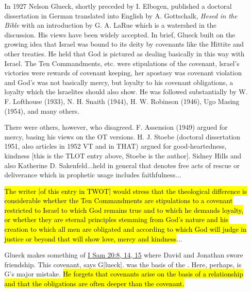 \begin{compactdesc}
\begin{compactdesc}
								In 1927 Nelson Glueck, shortly preceded by I. Elbogen, published a doctoral dissertation in German translated into English by A. Gottschalk, \textit{Hesed in the Bible} with an introduction by G. A. LaRue which is a watershed in the discussion. His views have been widely accepted. In brief, Glueck built on the growing idea that Israel was bound to its deity by covenants like the Hittite and other treaties. He held that God is pictured as dealing basically in this way with Israel. The Ten Commandments, etc. were stipulations of the covenant, lsrael's victories were rewards of covenant keeping, her apostasy was covenant violation and God's  was not basically mercy, but loyalty to his covenant obligations, a loyalty which the lsraelites should also show. He was followed substantially by W. F. Lofthouse (1933), N. H. Snaith (1944), H. W. Robinson (1946), Ugo Masing (1954), and many others.

								There were others, however, who disagreed. F. Assension (1949) argued for mercy, basing his views on the \textsc{OT} versions. H. J. Stoebe (doctoral dissertation 1951, also articles in 1952 VT and in THAT) argued for good-heartedness, kindness [this is the TLOT entry above, Stoebe is the author]. Sidney Hills and also Katherine D. Sakenfeld...held in general that  denotes free acts of rescue or deliverance which in prophetic usage includes faithfulness...

								\hl{The writer [of this entry in TWOT] would stress that the theological difference is considerable whether the Ten Commandments are stipulations to a covenant restricted to Israel to which God remains true and to which he demands loyalty, or whether they are eternal principles stemming from God's nature and his creation to which all men are obligated and according to which God will judge in justice or beyond that will show love, mercy and kindness}...

								Glueck makes something of \hyperref[1SAMUEL-20-8]{I Sam 20:8, 14, 15} where David and Jonathan swore friendship. This covenant, says G[lueck]. was the basis of the . Here, perhaps, is G's major mistake. \hl{He forgets that covenants arise on the basis of a relationship and that the obligations are often deeper than the covenant.}


\end{compactdesc}
\end{compactdesc}
